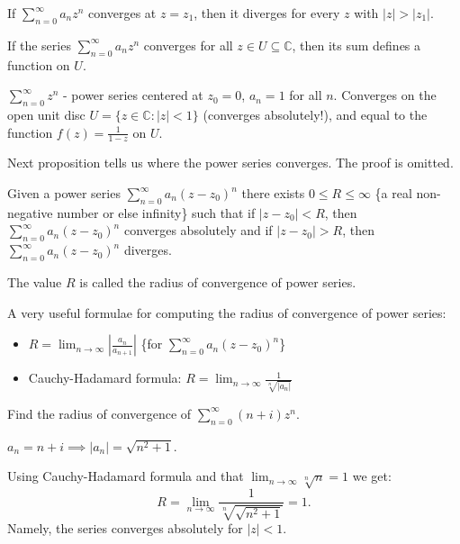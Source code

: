 \begin{corollary}\label{corollary:12.1}
    If $\sum_{n=0}^{\infty} a_n z^n$ converges at $z = z_1$, then it diverges for every $z$ with $|z| > |z_1|$.
\end{corollary}

\begin{definition}\label{definition:12,2} If the series $\sum_{n=0}^{\infty} a_n z^n$ converges for all $z \in U \subseteq \mathbb{C}$, then its sum defines a function on $U$.
\end{definition}

\begin{example} \label{example:13.1continued} $\sum_{n=0}^{\infty} z^n$ - power series centered at $z_0 = 0$, $a_n = 1$ for all $n$. Converges on the open unit disc $U = \{z \in \mathbb{C}: |z| < 1\}$ (converges absolutely!), and equal to the function $f(z) = \frac{1}{1-z}$ on $U$.
\end{example}

Next proposition tells us where the power series converges. The proof is omitted.

\begin{proposition}\label{proposition:12.1} Given a power series $\sum_{n=0}^{\infty} a_n (z - z_0)^n$ there exists $0 \leq R \leq \infty$ \{a real non-negative number or else infinity\} such that if $|z - z_0| < R$, then $\sum_{n=0}^{\infty} a_n (z - z_0)^n$ converges absolutely and if $|z - z_0| > R$, then $\sum_{n=0}^{\infty} a_n (z - z_0)^n$ diverges.
\end{proposition}

The value $R$ is called the radius of convergence of power series.

A very useful formulae for computing the radius of convergence of power series:

\begin{itemize}
    \item $R = \lim_{n \to \infty} \left| \frac{a_n}{a_{n+1}} \right|$ \{for $\sum_{n=0}^{\infty} a_n (z - z_0)^n$\}
    \item Cauchy-Hadamard formula: $R = \lim_{n \to \infty} \frac{1}{\sqrt[n]{|a_n|}}$
\end{itemize}

\begin{example}\label{example:14.1} Find the radius of convergence of $\sum_{n=0}^{\infty} (n+i)z^n$.
\begin{soln}
     $a_n = n + i \implies |a_n| = \sqrt{n^2 + 1}$.

    Using Cauchy-Hadamard formula and that $\lim_{n \to \infty} \sqrt[n]{n} = 1$ we get: 
    \[ R = \lim_{n \to \infty} \frac{1}{\sqrt[n]{\sqrt{n^2 + 1}}} = 1.\] 
    Namely, the series converges absolutely for $|z| < 1$.
\end{soln}
\end{example}

